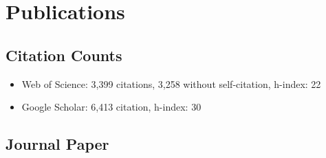 \documentclass[10pt, a4paper]{article}
\begin{document}
\section*{Publications}

\subsection*{Citation Counts}
\begin{itemize}
\item Web of Science: 3,399 citations, 3,258 without self-citation, h-index: 22
\item Google Scholar: 6,413 citation, h-index: 30 
\end{itemize}
\subsection*{Journal Paper}
\label{sec:org97ece48}
\end{document}
